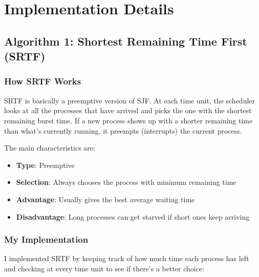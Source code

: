 \documentclass[12pt,letterpaper]{article}
\begin{document}
\newpage

\section{Implementation Details}

\subsection{Algorithm 1: Shortest Remaining Time First (SRTF)}

\subsubsection{How SRTF Works}

SRTF is basically a preemptive version of SJF. At each time unit, the scheduler 
looks at all the processes that have arrived and picks the one with the shortest 
remaining burst time. If a new process shows up with a shorter remaining time 
than what's currently running, it preempts (interrupts) the current process.

The main characteristics are:
\begin{itemize}
    \item \textbf{Type}: Preemptive
    \item \textbf{Selection}: Always chooses the process with minimum remaining time
    \item \textbf{Advantage}: Usually gives the best average waiting time
    \item \textbf{Disadvantage}: Long processes can get starved if short ones keep arriving
\end{itemize}

\subsubsection{My Implementation}

I implemented SRTF by keeping track of how much time each process has left and 
checking at every time unit to see if there's a better choice:
\end{document}
